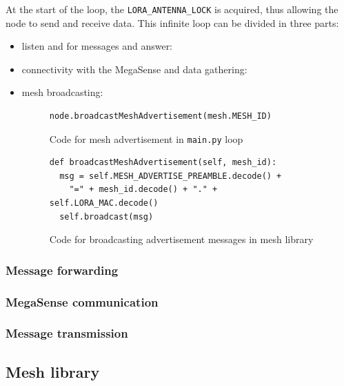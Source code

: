 				At the start of the loop, the \texttt{LORA\_ANTENNA\_LOCK} is acquired, thus allowing the node to send and receive data.
				This infinite loop can be divided in three parts:
				\begin{itemize}
					\item listen and for messages and answer:
					\item connectivity with the MegaSense and data gathering:
					\item mesh broadcasting:
						\begin{figure}[H]
							\begin{lstlisting}
node.broadcastMeshAdvertisement(mesh.MESH_ID)
							\end{lstlisting}
							\caption{Code for mesh advertisement in \texttt{main.py} loop}
							\label{code:mesh_advertisement_main}
						\end{figure}
					
						\begin{figure}
							\begin{lstlisting}
def broadcastMeshAdvertisement(self, mesh_id):
  msg = self.MESH_ADVERTISE_PREAMBLE.decode() + 
    "=" + mesh_id.decode() + "." + self.LORA_MAC.decode()
  self.broadcast(msg)
							\end{lstlisting}
							\caption{Code for broadcasting advertisement messages in mesh library}
							\label{code:mesh_advertisement_library}
						\end{figure}

				\end{itemize}	
			
			\subsubsection{Message forwarding}
			
			\subsubsection{MegaSense communication}
			
			\subsubsection{Message transmission}
			
		\subsection{Mesh library}\label{subsec:mesh_library}
		
